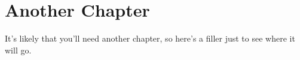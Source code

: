 \chapter{Another Chapter}

It's likely that you'll need another chapter, so here's a filler just to see
where it will go. 
